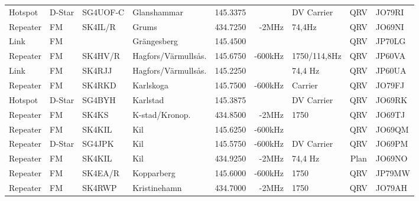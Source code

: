 \begin{landscape}
\begin{longtable}{llllrrlcl}
	Hotspot            & D-Star       & SG4UOF-C      & Glanshammar         &          145.3375 &                & DV Carrier      &       QRV       & JO79RI           \\
	Repeater           & FM           & SK4IL/R       & Grums               &          434.7250 &          -2MHz & 74,4Hz          &       QRV       & JO69NI           \\
	Link               & FM           &               & Grängesberg         &          145.4500 &                &                 &       QRV       & JP70LG           \\
	Repeater           & FM           & SK4HV/R       & Hagfors/Värmullsås. &          145.6750 &        -600kHz & 1750/114,8Hz    &       QRV       & JP60VA           \\
	Link               & FM           & SK4RJJ        & Hagfors/Värmullsås. &          145.2250 &                & 74,4 Hz         &       QRV       & JP60UA           \\
	Repeater           & FM           & SK4RKD        & Karlskoga           &          145.7500 &        -600kHz & Carrier         &       QRV       & JO79FJ           \\
	Hotspot            & D-Star       & SG4BYH        & Karlstad            &          145.3875 &                & DV Carrier      &       QRV       & JO69RK           \\
	Repeater           & FM           & SK4KS         & K-stad/Kronop.      &          434.8500 &          -2MHz & 1750            &       QRV       & JO69TJ           \\
	Repeater           & FM           & SK4KIL        & Kil                 &          145.6250 &        -600kHz &                 &       QRV       & JO69QM           \\
	Repeater           & D-Star       & SG4JPK        & Kil                 &          145.5750 &        -600kHz & DV Carrier      &       QRV       & JO69PM           \\
	Repeater           & FM           & SK4KIL        & Kil                 &          434.9250 &          -2MHz & 74,4 Hz         &      Plan       & JO69NO           \\
	Repeater           & FM           & SK4EA/R       & Kopparberg          &          145.6000 &        -600kHz & 1750            &       QRV       & JP79MW           \\
	Repeater           & FM           & SK4RWP        & Kristinehamn        &          434.7000 &          -2MHz & 1750            &       QRV       & JO79AH           \\

\end{longtable}
\end{landscape}
